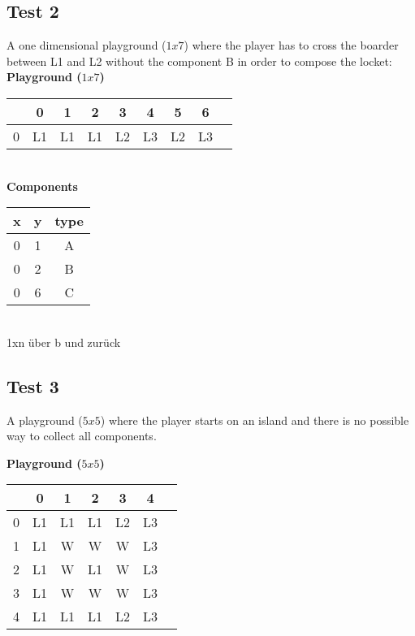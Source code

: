 \documentclass{article}
\begin{document}
\subsection{Test 2}
A one dimensional playground ($1 x 7$) where the player has to cross the boarder between L1 and L2 without the component B in order to compose the locket:\\ 

\textbf{Playground ($1 x 7$)}

\begin{tabular}{ |c|c|c|c|c|c|c|c|c| } 
 \hline
 & 0 & 1 & 2 & 3 & 4 & 5 & 6 \\ 
 \hline
 0 & L1 & L1 & L1 & L2 & L3 & L2 & L3 \\ 
 \hline
\end{tabular}
\\


\textbf{Components}

\begin{tabular}{ |c|c|c| } 
 \hline
 x & y & type  \\ 
 \hline
 0 & 1 & A \\
 0 & 2 & B \\
 0 & 6 & C \\ 
 \hline
\end{tabular}
\\


1xn über b und zurück


\subsection{Test 3}
A  playground ($5 x 5$) where the player starts on an island and there is no possible way to collect all components.

\textbf{Playground ($5 x 5$)}

\begin{tabular}{ |c|c|c|c|c|c|c| } 
 \hline
 & 0 & 1 & 2 & 3 & 4  \\ 
 \hline
 0 & L1 & L1 & L1 & L2 & L3 \\ 
 \hline
 1 & L1 & W & W & W & L3 \\ 
 \hline
 2 & L1 & W & L1 & W & L3 \\ 
 \hline
 3 & L1 & W & W & W & L3 \\ 
 \hline
 4 & L1 & L1 & L1 & L2 & L3 \\ 
 \hline
\end{tabular}
\\
\end{document}
